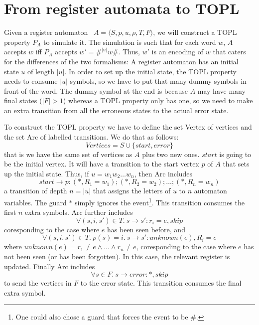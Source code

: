 \section{From register automata to TOPL}
Given a register automaton~\cite{dblp:journals/tcs/kaminskif94} $A=\langle S, p, u, \rho, T,
F\rangle$, we will construct a TOPL property $P_A$ to simulate it. The
simulation is such that for each word $w$, $A$ accepts $w$ iff $P_A$
accepts $w' = \#^{|u|}w\#$. Thus, $w'$ is an encoding of $w$ that
caters for the differences of the two formalisms: A register automaton has an
initial state $u$ of length $|u|$. In order to set up the initial
state, the TOPL property needs to consume $|u|$ symbols, so we have to
put that many dummy symbols in front of the word. The dummy symbol at
the end is because $A$ may have many final states ($|F| > 1$) whereas a TOPL
property only has one, so we need to make an extra transition from all
the erroneous states to the actual error state.


To construct the TOPL property we have to define the set Vertex
of vertices and the set Arc of labelled transitions. We do that as follows:
\[
Vertices = S \cup \{start, error\}
\]
that is we have the same set of vertices as $A$ plus two new
ones. $start$ is going to be the initial vertex. It will have a
transition to the start vertex $p$ of $A$ that sets up the
initial state. Thus, if $u = w_1w_2\ldots w_n$, then Arc includes
\[
start \to p: (*,R_1=w_1);(*,R_2=w_2);\ldots;(*,R_n=w_n)
\]
a transition of depth $n = |u|$ that assigns the letters of $u$
to $n$ automaton variables. The guard $*$ simply ignores the
event\footnote{One could also chose a guard that forces the event
to be \#.}. This transition consumes the first $n$ extra
symbols. Arc further includes
\[
\forall (s, i, s') \in T.\ s\to s': r_i=e, skip
\]
coresponding to the case where $e$ has been seen before, and
\[
\forall (s, i, s') \in T.\ \rho(s)=i.\ s\to s': unknown(e), R_i=e
\]
where $unknown(e) = r_1 \neq e \land \ldots \land r_n \neq e$,
coresponding to the case where $e$ has not been seen (or has been
forgotten). In this case, the relevant register is
updated. Finally Arc includes
\[
\forall s\in F.\ s\to error: *, skip
\]
to send the vertices in $F$ to the error state. This transition
consumes the final extra symbol.
